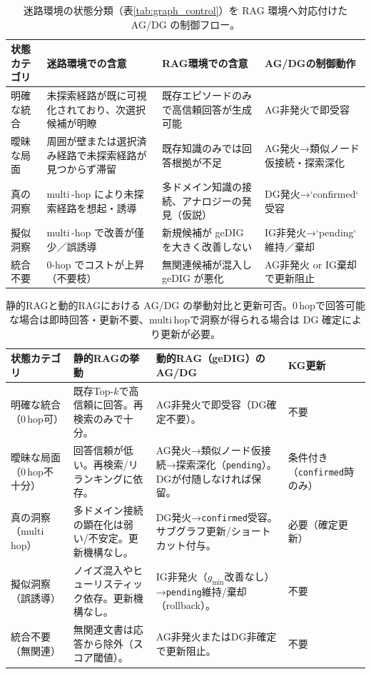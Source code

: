 \documentclass[ja=standard,xelatex]{bxjsarticle}
\begin{document}
\begin{table}[H]
\centering
\renewcommand{\arraystretch}{1.15}
\scriptsize
\begin{tabular}{p{26mm}p{38mm}p{42mm}p{34mm}}
\toprule
状態カテゴリ & 迷路環境での含意 & RAG環境での含意 & AG/DGの制御動作 \\
\midrule
明確な統合 & 未探索経路が既に可視化されており、次選択候補が明瞭 & 既存エピソードのみで高信頼回答が生成可能 & AG非発火で即受容 \\
曖昧な局面 & 周囲が壁または選択済み経路で未探索経路が見つからず滞留 & 既存知識のみでは回答根拠が不足 & AG発火→類似ノード仮接続・探索深化 \\
真の洞察 & multi\,\mbox{-}hop により未探索経路を想起・誘導 & 多ドメイン知識の接続、アナロジーの発見（仮説） & DG発火→`confirmed` 受容 \\
擬似洞察 & multi\,\mbox{-}hop で改善が僅少／誤誘導 & 新規候補が geDIG を大きく改善しない & IG非発火→`pending` 維持／棄却 \\
統合不要 & 0-hop でコストが上昇（不要枝） & 無関連候補が混入し geDIG が悪化 & AG非発火 or IG棄却で更新阻止 \\
\bottomrule
\end{tabular}
\caption{迷路環境の状態分類（表\ref{tab:graph_control}）を RAG 環境へ対応付けた AG/DG の制御フロー。}
\label{tab:na_bt_rag_mapping}
\end{table}
\renewcommand{\arraystretch}{1.0}

\begin{table}[H]
\centering
\renewcommand{\arraystretch}{1.15}
\scriptsize
\begin{tabular}{p{25mm}p{43mm}p{48mm}p{18mm}}
\toprule
状態カテゴリ & 静的RAGの挙動 & 動的RAG（geDIG）のAG/DG & KG更新 \\
\midrule
明確な統合（0\,hop可） & 既存Top-$k$で高信頼に回答。再検索のみで十分。 & AG非発火で即受容（DG確定不要）。 & 不要 \\
曖昧な局面（0\,hop不十分） & 回答信頼が低い。再検索/リランキングに依存。 & AG発火→類似ノード仮接続→探索深化（\texttt{pending}）。DGが付随しなければ保留。 & 条件付き（\texttt{confirmed}時のみ） \\
真の洞察（multi\,hop） & 多ドメイン接続の顕在化は弱い/不安定。更新機構なし。 & DG発火→\texttt{confirmed}受容。サブグラフ更新/ショートカット付与。 & 必要（確定更新） \\
擬似洞察（誤誘導） & ノイズ混入やヒューリスティック依存。更新機構なし。 & IG非発火（$g_{\min}$改善なし）→\texttt{pending}維持/棄却（rollback）。 & 不要 \\
統合不要（無関連） & 無関連文書は応答から除外（スコア閾値）。 & AG非発火またはDG非確定で更新阻止。 & 不要 \\
\bottomrule
\end{tabular}
\caption{静的RAGと動的RAGにおける AG/DG の挙動対比と更新可否。0\,hopで回答可能な場合は即時回答・更新不要、multi\,hopで洞察が得られる場合は DG 確定により更新が必要。}
\label{tab:rag_static_dynamic_flow}
\end{table}
\renewcommand{\arraystretch}{1.0}
\end{document}
